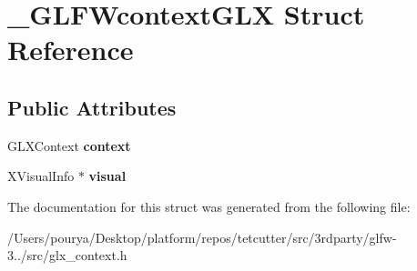\hypertarget{struct__GLFWcontextGLX}{}\section{\+\_\+\+G\+L\+F\+Wcontext\+G\+L\+X Struct Reference}
\label{struct__GLFWcontextGLX}
\subsection*{Public Attributes}
\begin{DoxyCompactItemize}
\item 
\hypertarget{struct__GLFWcontextGLX_a4ba7b1a68e032f0b25c40e7ae41d716e}{}G\+L\+X\+Context {\bfseries context}\label{struct__GLFWcontextGLX_a4ba7b1a68e032f0b25c40e7ae41d716e}

\item 
\hypertarget{struct__GLFWcontextGLX_acaa53fbd7889c0f65ad5391085e69a90}{}X\+Visual\+Info $\ast$ {\bfseries visual}\label{struct__GLFWcontextGLX_acaa53fbd7889c0f65ad5391085e69a90}

\end{DoxyCompactItemize}


The documentation for this struct was generated from the following file\+:\begin{DoxyCompactItemize}
\item 
/\+Users/pourya/\+Desktop/platform/repos/tetcutter/src/3rdparty/glfw-\/3../src/glx\+\_\+context.\+h\end{DoxyCompactItemize}
